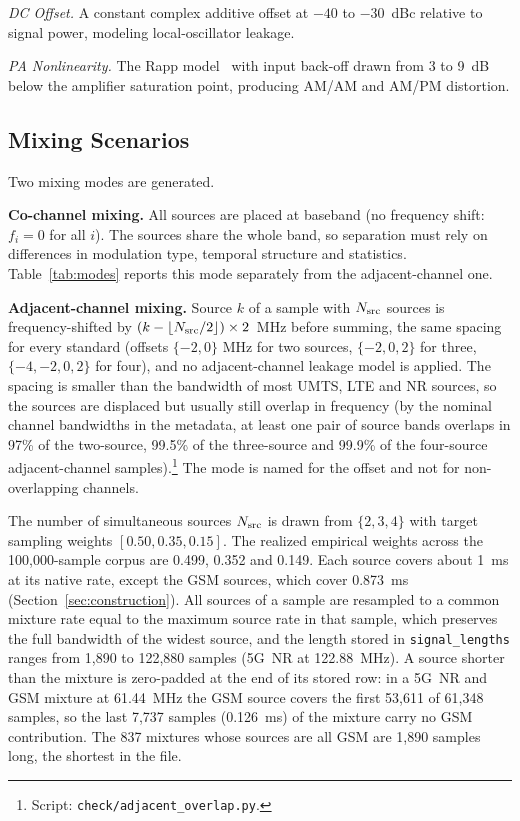 \documentclass[journal]{IEEEtran}
\begin{document}
\textit{DC Offset.} A constant complex additive offset at $-40$ to
$-30$~dBc relative to signal power, modeling local-oscillator leakage.

\textit{PA Nonlinearity.} The Rapp model~\cite{rapp1991effects} with
input back-off drawn from 3 to 9~dB below the amplifier saturation
point, producing AM/AM and AM/PM distortion.

\subsection{Mixing Scenarios}

Two mixing modes are generated.

\textbf{Co-channel mixing.} All sources are placed at baseband (no frequency
shift: $f_i\!=\!0$ for all $i$). The sources share the whole band, so separation
must rely on differences in modulation type, temporal structure and statistics.
Table~\ref{tab:modes} reports this mode separately from the adjacent-channel one.

\textbf{Adjacent-channel mixing.} Source $k$ of a sample with $N_{\rm src}$ sources is
frequency-shifted by $(k-\lfloor N_{\rm src}/2\rfloor)\times 2$~MHz before summing, the same
spacing for every standard (offsets $\{-2,0\}$ MHz for two sources, $\{-2,0,2\}$ for three,
$\{-4,-2,0,2\}$ for four), and no adjacent-channel leakage model is applied. The spacing is smaller than the bandwidth of most UMTS, LTE and NR
sources, so the sources are displaced but usually still overlap in frequency
(by the nominal channel bandwidths in the metadata, at least one pair of source bands overlaps in 97\% of the two-source, 99.5\% of the three-source and 99.9\% of the four-source adjacent-channel samples).\footnote{Script: \texttt{check/adjacent\_overlap.py}.} The mode is
named for the offset and not for non-overlapping channels.

The number of simultaneous sources $N_{\rm src}$ is drawn from $\{2, 3, 4\}$
with target sampling weights $[0.50, 0.35, 0.15]$. The realized empirical
weights across the 100,000-sample corpus are 0.499, 0.352 and 0.149.
Each source covers about 1~ms at its native rate, except the GSM sources,
which cover 0.873~ms (Section~\ref{sec:construction}). All sources of a sample
are resampled to a common mixture rate equal to the maximum source rate in that
sample, which preserves the full bandwidth of the widest source, and the length
stored in \texttt{signal\_lengths} ranges from 1,890 to 122,880 samples (5G~NR at
122.88~MHz). A source shorter than the mixture is zero-padded at the end of its
stored row: in a 5G~NR and GSM mixture at 61.44~MHz the GSM source covers the
first 53,611 of 61,348 samples, so the last 7,737 samples (0.126~ms) of the
mixture carry no GSM contribution. The 837 mixtures whose sources are all GSM
are 1,890 samples long, the shortest in the file.
\end{document}
